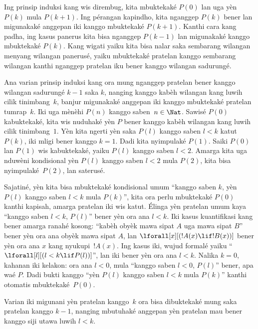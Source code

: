 \documentclass[../../../include/open-logic-section]{subfiles}
\begin{document}


Ing prinsip induksi kang wis dirembug,
kita mbuktekaké $P(0)$ lan uga yèn
$P(k)$ mula $P(k+1)$. Ing pérangan
kapindho, kita nganggep $P(k)$ bener
lan migunakaké anggepan iki kanggo
mbuktekaké $P(k+1)$. Kanthi cara kang
padha, ing kasus panerus kita bisa nganggep $P(k-1)$
lan migunakaké kanggo mbuktekaké
$P(k)$. Kang wigati yaiku kita bisa
nalar saka sembarang wilangan menyang
wilangan panerusé, yaiku mbuktekaké
pratelan kanggo sembarang wilangan
kanthi nganggep pratelan iku bener
kanggo wilangan sadurungé.

Ana varian prinsip induksi kang
ora mung nganggep pratelan bener
kanggo wilangan sadurungé $k-1$
saka $k$, nanging kanggo kabèh
wilangan kang luwih cilik tinimbang~$k$,
banjur migunakaké anggepan iki
kanggo mbuktekaké pratelan tumrap~$k$.
Iki uga mènèhi $P(n)$ kanggo
saben~$n \in
\Nat$. Sawisé $P(0)$ kabuktekaké,
kita wis nuduhaké yèn $P$ bener
kanggo kabèh wilangan kang luwih
cilik tinimbang~$1$. Yèn kita
ngerti yèn saka $P(l)$ kanggo
saben $l<k$ katut $P(k)$,
iki mligi bener kanggo $k=1$.
Dadi kita nyimpulaké $P(1)$.
Saiki $P(0)$ lan $P(1)$ wis
kabuktekaké, yaiku $P(l)$ kanggo
saben $l<2$. Amarga kita uga
nduwèni kondisional yèn $P(l)$
kanggo saben $l<2$ mula $P(2)$,
kita bisa nyimpulaké~$P(2)$,
lan saterusé.

Sajatiné, yèn kita bisa mbuktekaké
kondisional umum ``kanggo saben $k$,
yèn $P(l)$ kanggo saben $l<k$
mula $P(k)$'', kita ora perlu
mbuktekaké $P(0)$ kanthi kapisah,
amarga pratelan iki wis katut.
Élinga yèn pratelan umum kaya
``kanggo saben $l<k$, $P(l)$''
bener yèn ora ana $l<k$.
Iki kasus kuantifikasi kang bener amarga ranahé kosong:
``kabèh obyèk mawa sipat $A$ uga mawa sipat $B$'' bener
yèn ora ana obyèk mawa sipat $A$, lan
$\lforall[x][(!A(x) \lif !B(x))]$
bener yèn ora ana $x$ kang
nyukupi~$!A(x)$. Ing kasus iki,
wujud formalé yaiku
``$\lforall[l][(l < k \lif P(l))]$'',
lan iki bener yèn ora ana
$l < k$. Nalika $k=0$, kahanan
iki kelakon: ora ana $l<0$,
mula ``kanggo saben $l<0$,
$P(l)$'' bener, apa waé $P$.
Dadi bukti kanggo ``yèn $P(l)$
kanggo saben $l<k$ mula $P(k)$''
kanthi otomatis mbuktekaké~$P(0)$.

Varian iki migunani yèn pratelan
kanggo~$k$ ora bisa dibuktekaké
mung saka pratelan kanggo $k-1$,
nanging mbutuhaké anggepan yèn
pratelan mau bener kanggo siji
utawa luwih $l<k$.
\end{document}
